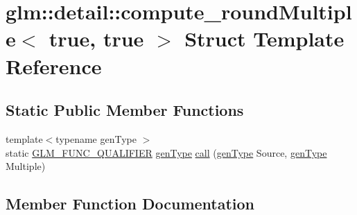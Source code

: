 \hypertarget{structglm_1_1detail_1_1compute__round_multiple_3_01true_00_01true_01_4}{}\section{glm\+:\+:detail\+:\+:compute\+\_\+round\+Multiple$<$ true, true $>$ Struct Template Reference}
\label{structglm_1_1detail_1_1compute__round_multiple_3_01true_00_01true_01_4}
\subsection*{Static Public Member Functions}
\begin{DoxyCompactItemize}
\item 
{\footnotesize template$<$typename gen\+Type $>$ }\\static \hyperlink{setup_8hpp_a33fdea6f91c5f834105f7415e2a64407}{G\+L\+M\+\_\+\+F\+U\+N\+C\+\_\+\+Q\+U\+A\+L\+I\+F\+I\+ER} \hyperlink{structglm_1_1detail_1_1gen_type}{gen\+Type} \hyperlink{structglm_1_1detail_1_1compute__round_multiple_3_01true_00_01true_01_4_ad2ba30e3338e768e6119c957f44b2216}{call} (\hyperlink{structglm_1_1detail_1_1gen_type}{gen\+Type} Source, \hyperlink{structglm_1_1detail_1_1gen_type}{gen\+Type} Multiple)
\end{DoxyCompactItemize}


\subsection{Member Function Documentation}
\mbox{\label{structglm_1_1detail_1_1compute__round_multiple_3_01true_00_01true_01_4_ad2ba30e3338e768e6119c957f44b2216}} 

